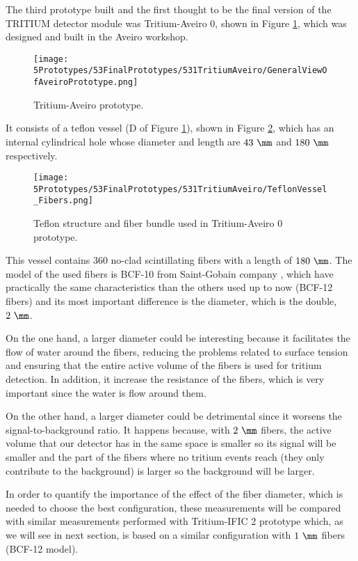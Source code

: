 The third prototype built and the first thought to be the final version of the TRITIUM detector module was Tritium-Aveiro 0, shown in Figure \ref{fig:TritiumAveiro0}, which was designed and built in the Aveiro workshop. 

\begin{figure}[h]
\centering
\texttt{[image: 5Prototypes/53FinalPrototypes/531TritiumAveiro/GeneralViewOfAveiroPrototype.png]}
\caption{Tritium-Aveiro prototype.\label{fig:TritiumAveiro0}}
\end{figure}


It consists of a teflon vessel (D of Figure \ref{fig:TritiumAveiro0}), shown in Figure \ref{fig:TeflonStructureFibersTritiumAveiro0}, which has an internal cylindrical hole whose diameter and length are $43~\mm$ and $180~\mm$ respectively. 

\begin{figure}[h]
\centering
\texttt{[image: 5Prototypes/53FinalPrototypes/531TritiumAveiro/TeflonVessel\_Fibers.png]}
\caption{Teflon structure and fiber bundle used in Tritium-Aveiro 0 prototype.\label{fig:TeflonStructureFibersTritiumAveiro0}}
\end{figure}

This vessel contains $360$ no-clad scintillating fibers with a length of $180~\mm$. The model of the used fibers is BCF-10 from Saint-Gobain company \cite{DataSheetBCF10Fiber}, which have practically the same characteristics than the others used up to now (BCF-12 fibers) and its most important difference is the diameter, which is the double, $2~\mm$.

On the one hand, a larger diameter could be interesting because it facilitates the flow of water around the fibers, reducing the problems related to surface tension and ensuring that the entire active volume of the fibers is used for tritium detection. In addition, it increase the resistance of the fibers, which is very important since the water is flow around them.

On the other hand, a larger diameter could be detrimental since it worsens the signal-to-background ratio. It happens because, with $2~\mm$ fibers, the active volume that our detector has in the same space is smaller so its signal will be smaller and the part of the fibers where no tritium events reach (they only contribute to the background) is larger so the background will be larger.

In order to quantify the importance of the effect of the fiber diameter, which is needed to choose the best configuration, these measurements will be compared with similar measurements performed with Tritium-IFIC 2 prototype which, as we will see in next section, is based on a similar configuration with $1~\mm$ fibers (BCF-12 model).

